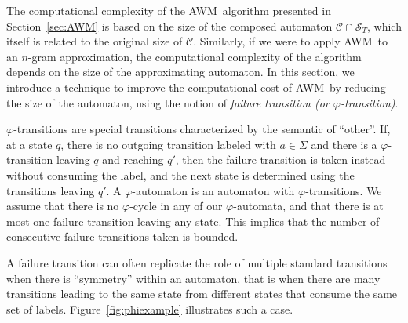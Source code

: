 \documentclass{article}
\newcommand{\sC}{\mathscr C}
\newcommand{\sS}{\mathscr S}
\renewcommand{\phi}{\varphi}
\newcommand{\AWM}{\textsc{AWM}}
\begin{document}

The computational complexity of the \AWM\ algorithm presented in
Section~\ref{sec:AWM} is based on the size of the composed
automaton $\sC \cap \sS_T$, which itself is related to the
original size of $\sC$. Similarly, if we were to apply \AWM\
to an $n$-gram approximation, the computational complexity of the algorithm
depends on the size of the approximating automaton. 
In this section, we introduce a technique to improve the computational cost
of \AWM\ by reducing the size of the automaton, using the notion
of \emph{failure transition (or $\phi$-transition)}.

$\phi$-transitions are special transitions characterized by the semantic of 
``other''. If, at a state $q$, there is no outgoing transition labeled with
$a \in \Sigma$ and there is a $\phi$-transition leaving $q$
and reaching $q'$, then 
the failure transition is taken instead without
consuming the label, and the next state is determined using the
transitions leaving $q'$. A $\phi$-automaton is an automaton with $\phi$-transitions.
We assume that there is no $\phi$-cycle in
any of our $\phi$-automata, and that there is at most one failure
transition leaving any state. This implies that the number of
consecutive failure transitions taken is bounded.

A failure transition can often replicate
the role of multiple standard transitions when there is ``symmetry''
within an automaton, that is when there are many transitions leading
to the same state from different states that consume the same set of
labels. Figure~\ref{fig:phiexample} illustrates such a case.
\end{document}
